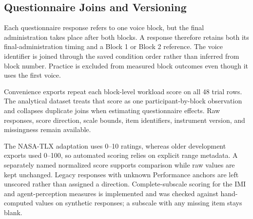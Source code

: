 \subsection{Questionnaire Joins and Versioning}
\label{sec:questionnaire-joins}
Each questionnaire response refers to one voice block, but the final administration takes place after both blocks. A response therefore retains both its final-administration timing and a Block 1 or Block 2 reference. The voice identifier is joined through the saved condition order rather than inferred from block number. Practice is excluded from measured block outcomes even though it uses the first voice.

Convenience exports repeat each block-level workload score on all 48 trial rows. The analytical dataset treats that score as one participant-by-block observation and collapses duplicate joins when estimating questionnaire effects. Raw responses, score direction, scale bounds, item identifiers, instrument version, and missingness remain available.

The NASA-TLX adaptation uses 0--10 ratings, whereas older development exports used 0--100, so automated scoring relies on explicit range metadata. A separately named normalized score supports comparison while raw values are kept unchanged. Legacy responses with unknown Performance anchors are left unscored rather than assigned a direction. Complete-subscale scoring for the IMI and agent-perception measures is implemented and was checked against hand-computed values on synthetic responses; a subscale with any missing item stays blank.


